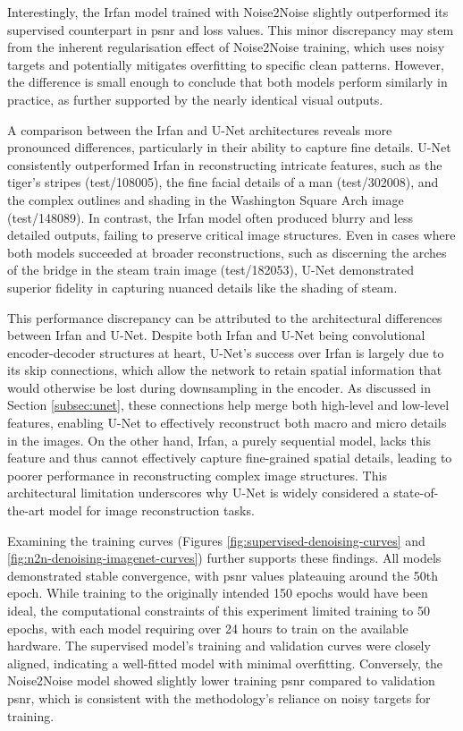 Interestingly, the Irfan model trained with Noise2Noise slightly outperformed its supervised counterpart in \acrshort{psnr} and loss values. This minor discrepancy may stem from the inherent regularisation effect of Noise2Noise training, which uses noisy targets and potentially mitigates overfitting to specific clean patterns. However, the difference is small enough to conclude that both models perform similarly in practice, as further supported by the nearly identical visual outputs.

A comparison between the Irfan and U-Net architectures reveals more pronounced differences, particularly in their ability to capture fine details. U-Net consistently outperformed Irfan in reconstructing intricate features, such as the tiger’s stripes (test/108005), the fine facial details of a man (test/302008), and the complex outlines and shading in the Washington Square Arch image (test/148089). In contrast, the Irfan model often produced blurry and less detailed outputs, failing to preserve critical image structures. Even in cases where both models succeeded at broader reconstructions, such as discerning the arches of the bridge in the steam train image (test/182053), U-Net demonstrated superior fidelity in capturing nuanced details like the shading of steam.

This performance discrepancy can be attributed to the architectural differences between Irfan and U-Net. Despite both Irfan and U-Net being convolutional encoder-decoder structures at heart, U-Net's success over Irfan is largely due to its skip connections, which allow the network to retain spatial information that would otherwise be lost during downsampling in the encoder. As discussed in Section \ref{subsec:unet}, these connections help merge both high-level and low-level features, enabling U-Net to effectively reconstruct both macro and micro details in the images. On the other hand, Irfan, a purely sequential model, lacks this feature and thus cannot effectively capture fine-grained spatial details, leading to poorer performance in reconstructing complex image structures. This architectural limitation underscores why U-Net is widely considered a state-of-the-art model for image reconstruction tasks.

Examining the training curves (Figures \ref{fig:supervised-denoising-curves} and \ref{fig:n2n-denoising-imagenet-curves}) further supports these findings. All models demonstrated stable convergence, with \acrshort{psnr} values plateauing around the 50th epoch. While training to the originally intended 150 epochs would have been ideal, the computational constraints of this experiment limited training to 50 epochs, with each model requiring over 24 hours to train on the available hardware. The supervised model's training and validation curves were closely aligned, indicating a well-fitted model with minimal overfitting. Conversely, the Noise2Noise model showed slightly lower training \acrshort{psnr} compared to validation \acrshort{psnr}, which is consistent with the methodology's reliance on noisy targets for training.

